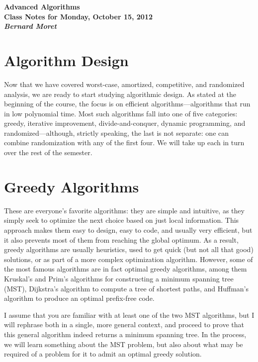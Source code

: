 \documentclass[11pt]{article}
\begin{document}
\begin{center}
  \LARGE\bf Advanced Algorithms\\

  \Large\sf
  Class Notes for Monday, October 15, 2012\\

  \it
  Bernard Moret
\end{center}

\bigskip

\section{Algorithm Design}
Now that we have covered worst-case, amortized, competitive, and randomized
analysis, we are ready to start studying algorithmic design.  As stated at
the beginning of the course, the focus is on efficient algorithms---algorithms
that run in low polynomial time.  Most such algorithms fall into one of five
categories: greedy, iterative improvement, divide-and-conquer, dynamic
programming, and randomized---although, strictly speaking, the last is not
separate: one can combine randomization with any of the first four.
We will take up each in turn over the rest of the semester.

\section{Greedy Algorithms}
These are everyone's favorite algorithms: they are simple and intuitive,
as they simply seek to optimize the next choice based on just local information.
This approach makes them easy to design,
easy to code, and usually very efficient, but it also prevents most of them
from reaching the global optimum.   As a result, greedy algorithms are usually
heuristics, used to get quick (but not all that good) solutions, or as part
of a more complex optimization algorithm.  However, some of the most famous
algorithms are in fact optimal greedy algorithms, among them Kruskal's and
Prim's algorithms for constructing a minimum spanning tree (MST), Dijkstra's
algorithm to compute a tree of shortest paths, and Huffman's algorithm
to produce an optimal prefix-free code.

I assume that you are familiar with at least one of the two MST algorithms,
but I will rephrase both in a single, more general context, and proceed to
prove that this general algorithm indeed returns a minimum spanning tree.
In the process, we will learn something about the MST problem, but also
about what may be required of a problem for it to admit an optimal greedy
solution.
\end{document}
